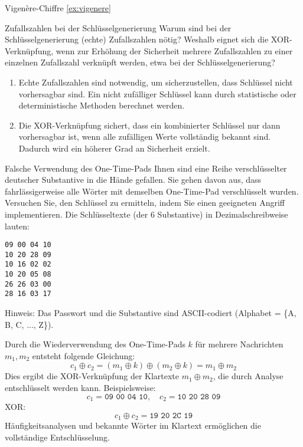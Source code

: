 \documentclass{article}
\begin{document}
\setcounter{subsection}{20}
\begin{exercise}{Vigenère-Chiffre \ref{ex:vigenere}}\end{exercise}

\begin{exercise}{Zufallszahlen bei der Schlüsselgenerierung}
  Warum sind bei der Schlüsselgenerierung (echte) Zufallszahlen nötig? Weshalb eignet sich die XOR-Verknüpfung, wenn zur Erhöhung der Sicherheit mehrere Zufallszahlen zu einer einzelnen Zufallszahl verknüpft werden, etwa bei der Schlüsselgenerierung?

  \begin{solution}
    \begin{enumerate}
        \item Echte Zufallszahlen sind notwendig, um sicherzustellen, dass Schlüssel nicht vorhersagbar sind. Ein nicht zufälliger Schlüssel kann durch statistische oder deterministische Methoden berechnet werden.
        \item Die XOR-Verknüpfung sichert, dass ein kombinierter Schlüssel nur dann vorhersagbar ist, wenn alle zufälligen Werte vollständig bekannt sind. Dadurch wird ein höherer Grad an Sicherheit erzielt.
    \end{enumerate}
  \end{solution}
\end{exercise}

\begin{exercise}{Falsche Verwendung des One-Time-Pads}
  Ihnen sind eine Reihe verschlüsselter deutscher Substantive in die Hände gefallen. Sie gehen davon aus, dass fahrlässigerweise alle Wörter mit demselben One-Time-Pad verschlüsselt wurden. Versuchen Sie, den Schlüssel zu ermitteln, indem Sie einen geeigneten Angriff implementieren. Die Schlüsseltexte (der 6 Substantive) in Dezimalschreibweise lauten:

  \begin{center}
    \texttt{09 00 04 10} \\
    \texttt{10 20 28 09} \\
    \texttt{10 16 02 02} \\
    \texttt{10 20 05 08} \\
    \texttt{26 26 03 00} \\
    \texttt{28 16 03 17}
  \end{center}

  Hinweis: Das Passwort und die Substantive sind ASCII-codiert (Alphabet = \{A, B, C, ..., Z\}).

  \begin{solution}
    Durch die Wiederverwendung des One-Time-Pads $ k $ für mehrere Nachrichten $ m_1, m_2 $ entsteht folgende Gleichung:
      \[ c_1 \oplus c_2 = (m_1 \oplus k) \oplus (m_2 \oplus k) = m_1 \oplus m_2 \]
    Dies ergibt die XOR-Verknüpfung der Klartexte $ m_1 \oplus m_2 $, die durch Analyse entschlüsselt werden kann. Beispielsweise:
      \[ c_1 = \texttt{09 00 04 10}, \quad c_2 = \texttt{10 20 28 09} \]
    XOR:
      \[ c_1 \oplus c_2 = \texttt{19 20 2C 19} \]
    Häufigkeitsanalysen und bekannte Wörter im Klartext ermöglichen die vollständige Entschlüsselung.
  \end{solution}
\end{exercise}
\end{document}
